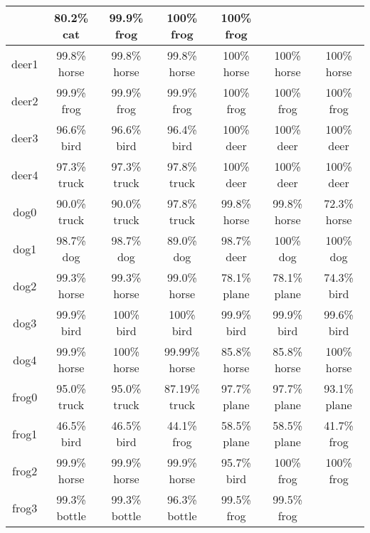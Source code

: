 \begin{longtable}{| c | c | c | c | c | c | c |}
& 80.2\% cat 	
&  99.9\% frog 	
& 100\% frog 	
& 100\% frog\\
 \hline
deer1\cellcolor{light-gray} 	
& 99.8\% horse		
& 99.8\% horse 	
& 99.8\% horse 	
&  100\% horse 	 
& 100\% horse 	
& 100\% horse\\
 \hline
deer2\cellcolor{light-gray} 	
& 99.9\% frog		
& 99.9\% frog 	
& 99.9\% frog 	
&  100\% frog	
 & 100\% frog 	
 & 100\% frog\\
 \hline
deer3\cellcolor{light-gray} 	
& 96.6\% bird		
& 96.6\% bird 	
& 96.4\% bird 	
&  100\% deer\cellcolor{green}	 
& 100\% deer\cellcolor{green} 	
& 100\% deer\cellcolor{green}\\
 \hline
deer4\cellcolor{light-gray} 	
& 97.3\% truck		
& 97.3\% truck 	
& 97.8\% truck 	
&  100\% deer\cellcolor{green} 	 
& 100\% deer\cellcolor{green} 	
& 100\% deer\cellcolor{green}\\
 \hline
dog0 \cellcolor{light-gray}	
& 90.0\% truck		
& 90.0\% truck 	
& 97.8\% truck 	
&  99.8\% horse	 
& 99.8\% horse 
& 72.3\% horse\\
 \hline
dog1 \cellcolor{light-gray}	
& 98.7\% dog\cellcolor{green}		
& 98.7\% dog\cellcolor{green} 	
& 89.0\% dog\cellcolor{green} 	
&  98.7\% deer 	 
& 100\% dog\cellcolor{green} 	
& 100\% dog\cellcolor{green}\\
 \hline
dog2 \cellcolor{light-gray}	
& 99.3\% horse		
& 99.3\% horse  
& 99.0\% horse 	
&  78.1\% plane
& 78.1\% plane 
& 74.3\% bird\\
 \hline
dog3 \cellcolor{light-gray}	
& 99.9\% bird		
& 100\% bird 	
& 100\% bird 	
&  99.9\% bird	 
& 99.9\% bird 	
& 99.6\% bird\\
 \hline
dog4 \cellcolor{light-gray}	
& 99.9\% horse		
& 100\% horse 	
& 99.99\% horse 
&  85.8\% horse	
 & 85.8\% horse 
 & 100\% horse \\
 \hline
frog0 \cellcolor{light-gray}	
& 95.0\% truck		
& 95.0\% truck 	
& 87.19\% truck 
&  97.7\% plane
& 97.7\% plane 
& 93.1\% plane\\
 \hline
frog1 \cellcolor{light-gray}	
& 46.5\% bird		
& 46.5\% bird 	
& 44.1\% frog\cellcolor{green} 	
&  58.5\% plane& 58.5\% plane 
& 41.7\% frog\cellcolor{green}\\
 \hline
frog2 \cellcolor{light-gray}	
& 99.9\% horse		
& 99.9\% horse 	
& 99.9\% horse 	
&  95.7\% bird	 
& 100\% frog\cellcolor{green} 	
& 100\% frog\cellcolor{green}\\
 \hline
frog3 \cellcolor{light-gray}	
& 99.3\% bottle		
& 99.3\% bottle 	
& 96.3\% bottle 	
&  99.5\% frog\cellcolor{green}	 
& 99.5\% frog\cellcolor{green} 	

\end{longtable}
